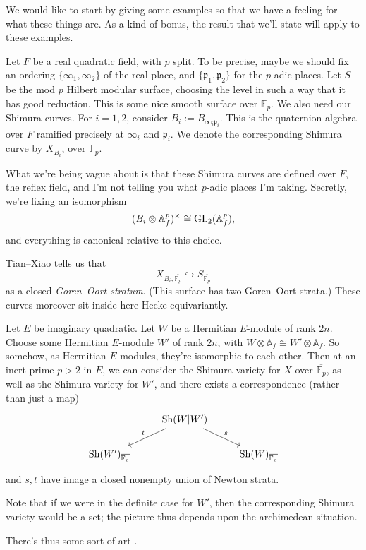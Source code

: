 \documentclass[reqno]{amsart} 
\begin{document}
We would like to start by giving some examples so that we have a feeling for what these things are.  As a kind of bonus, the result that we'll state will apply to these examples.
\begin{example}\label{example:cnpp15n4tc}
  Let $F$ be a real quadratic field, with $p$ split.  To be precise, maybe we should fix an ordering $\{\infty_1, \infty_2 \}$ of the real place, and $\{ \mathfrak{p}_1, \mathfrak{p}_2\}$ for the $p$-adic places.  Let $S$ be the mod $p$ Hilbert modular surface, choosing the level in such a way that it has good reduction.  This is some nice smooth surface over $\mathbb{F}_p$.  We also need our Shimura curves.  For $i = 1, 2$, consider $B_i := B_{\infty_i \mathfrak{p}_i}$.  This is the quaternion algebra over $F$ ramified precisely at $\infty_i$ and $\mathfrak{p}_i$.  We denote the corresponding Shimura curve by $X_{B_i}$, over $\mathbb{F}_p$.

  What we're being vague about is that these Shimura curves are defined over $F$, the reflex field, and I'm not telling you what $p$-adic places I'm taking.  Secretly, we're fixing an isomorphism
  \begin{equation*}
    (B_i \otimes \mathbb{A}_f^p )^\times \cong \operatorname{GL}_2(\mathbb{A}_f^p),
  \end{equation*}
  and everything is canonical relative to this choice.

  Tian--Xiao tells us that
  \begin{equation*}
    X_{B_i, \overline{\mathbb{F}_p}} \hookrightarrow S_{\overline{\mathbb{F}_p}}
  \end{equation*}
  as a closed \emph{Goren--Oort stratum}.  (This surface has two Goren--Oort strata.)  These curves moreover sit inside here Hecke equivariantly.
\end{example}
\begin{example}\label{example:cnpp15w7ik}
  Let $E$ be imaginary quadratic.  Let $W$ be a Hermitian $E$-module of rank $2 n$.  Choose some Hermitian $E$-module $W'$ of rank $2 n$, with $W \otimes \mathbb{A}_f \cong W ' \otimes \mathbb{A}_f$.  So somehow, as Hermitian $E$-modules, they're isomorphic to each other.  Then at an inert prime $p > 2$ in $E$, we can consider the Shimura variety for $X$ over $\overline{\mathbb{F}_p}$, as well as the Shimura variety for $W'$, and there exists a correspondence (rather than just a map)
  \begin{equation*}
    \begin{tikzcd}
      & \operatorname{Sh}(W | W') \arrow[ld, "t"'] \arrow[rd, "s"] & \\
      \operatorname{Sh}(W')_{\overline{\mathbb{F}_p}} & & \operatorname{Sh}(W)_{\overline{\mathbb{F}_p}}
    \end{tikzcd}
  \end{equation*}
  and $s, t$ have image a closed nonempty union of Newton strata.  

  Note that if we were in the definite case for $W'$, then the corresponding Shimura variety would be a set; the picture thus depends upon the archimedean situation.

  There's thus some sort of art .
\end{example}
\end{document}
